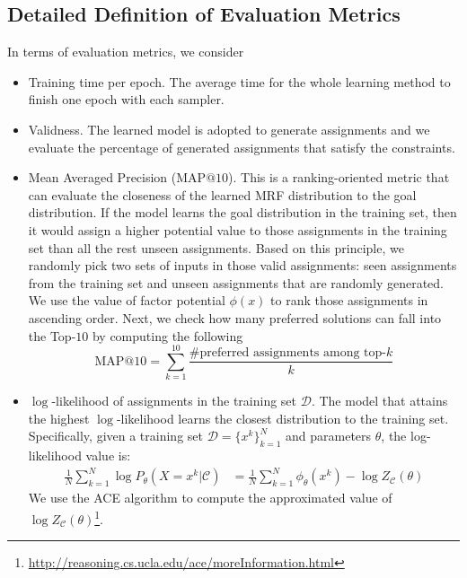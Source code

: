 \documentclass[letterpaper]{article} %
\begin{document}
\subsection{Detailed Definition of Evaluation Metrics}
In terms of evaluation metrics, we consider
\begin{itemize}
    \item Training time per epoch. The average time for the whole learning method  to finish one epoch with each sampler.
    \item Validness. The learned model is adopted to generate assignments and we evaluate the percentage of generated assignments that satisfy the constraints.
    \item  Mean Averaged Precision (MAP$@10$).  This is a ranking-oriented metric that can evaluate the closeness of  the learned MRF  distribution to the  goal distribution. If the model learns the goal distribution in the training set, then it would assign a higher potential value to those assignments in the training set than all the rest unseen assignments. Based on this principle,
    we randomly pick two sets of inputs in those valid assignments: seen assignments from the training set  and unseen  assignments that are randomly generated. We use the value of factor potential $\phi(x)$ to rank those assignments in ascending order.  Next, we check how many preferred solutions can fall into the Top-$10$ by computing the following
\begin{equation*}
\text{MAP}@10=\sum_{k=1}^{10}\frac{\#\text{preferred assignments among top-} k}{k}
\end{equation*}

    \item $\log$-likelihood of assignments in the training set $\mathcal{D}$. The model that attains the highest $\log$-likelihood learns the closest  distribution to the training set.  Specifically, given a training set $\mathcal{D}=\{x^k\}_{k=1}^N$ and parameters $\theta$, the log-likelihood value is:
\begin{equation} 
\begin{aligned}
{\frac{1}{N}\sum_{k=1}^N\log P_{\theta}(X=x^k|\mathcal{C})}&=\frac{1}{N}\sum_{k=1}^N\phi_\theta(x^k)- \log Z_\mathcal{C}(\theta)
\end{aligned}
\end{equation}
We use the ACE algorithm to compute the approximated value of $\log Z_\mathcal{C}(\theta) $\footnote{\url{http://reasoning.cs.ucla.edu/ace/moreInformation.html}}.


\end{itemize}
\end{document}
